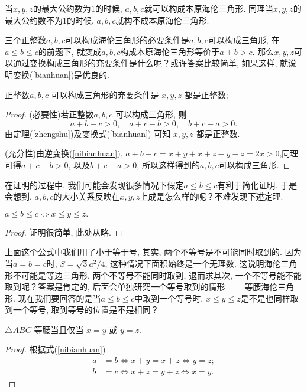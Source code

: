 \documentclass[12pt]{article}
\begin{document}
当$x,y,z$的最大公约数为$1$的时候, $a,b,c$就可以构成本原海伦三角形. 同理当$x,y,z$的最大公约数不为$1$的时候, $a,b,c$就构不成本原海伦三角形. 
    
三个正整数$a,b,c$可以构成海伦三角形的必要条件是$a,b,c$可以构成三角形, 在$a\le b\le c$的前题下, 就变成$a,b,c$构成本原海伦三角形等价于$a+b>c$. 那么$x,y,z$可以通过变换构成三角形的充要条件是什么呢？或许答案比较简单, 如果这样, 就说明变换(\ref{bianhuan})是优良的. 

\begin{theorem}
    正整数$a,b,c$ 可以构成三角形的充要条件是 $x,y,z$ 都是正整数; 
\end{theorem}
\begin{proof}
    (必要性)若正整数$a,b,c$ 可以构成三角形, 则
     \[a+b-c>0, \quad a+c-b>0, \quad b+c-a>0. \]
     由定理(\ref{zhengshu})及变换式(\ref{bianhuan})
可知 $x,y,z$ 都是正整数. \par
    (充分性)由逆变换(\ref{nibianhuan}), $a+b-c=x+y+x+z-y-z=2x>0$,同理可得$a+c-b>0$, 以及$b+c-a>0$, 所以这样得到的$a,b,c$可以构成三角形. 
\end{proof}

在证明的过程中, 我们可能会发现很多情况下假定$a\le b\le c$有利于简化证明. 于是会想到, $a,b,c$的大小关系反映在$x,y,z$上成是怎么样的呢？不难发现下述定理. 
\begin{theorem}
    $a\le b\le c\iff x\le y\le z. $
\end{theorem}

\begin{proof}
    证明很简单, 此处从略. 
\end{proof}

上面这个公式中我们用了小于等于号, 其实, 两个不等号是不可能同时取到的. 因为当$a=b=c$时, $S=\sqrt3a^2/4$, 这种情况下面积始终是一个无理数. 这说明海伦三角形不可能是等边三角形. 两个不等号不能同时取到, 退而求其次, 一个不等号能不能取到呢？答案是肯定的, 后面会单独研究一个等号取到的情形------ 等腰海伦三角形. 现在我们要回答的是当$a\le b\le c$中取到一个等号时, $x\le y\le z$是不是也同样取到一个等号, 取到等号的位置是不是相同？

\begin{theorem}
    $\bigtriangleup ABC$ 等腰当且仅当 $x=y$ 或 $y=z$. 
\end{theorem}
\begin{proof}根据式(\ref{nibianhuan})
    \begin{align*}
        a & =b\iff x+y=x+z\iff y=z ; \\
        b & =c\iff x+z=y+z\iff x=y . 
    \end{align*}
\end{proof}
\end{document}
